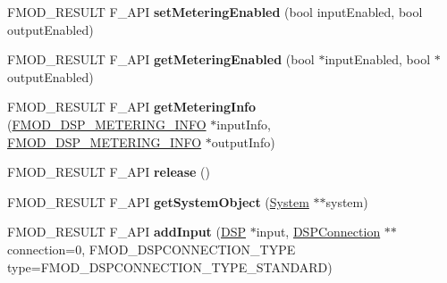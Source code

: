 \begin{DoxyCompactItemize}
\item 
\hypertarget{class_f_m_o_d_1_1_d_s_p_a6632c3020c1a14c13786bab1a3d42688}{F\+M\+O\+D\+\_\+\+R\+E\+S\+U\+L\+T F\+\_\+\+A\+P\+I {\bfseries set\+Metering\+Enabled} (bool input\+Enabled, bool output\+Enabled)}\label{class_f_m_o_d_1_1_d_s_p_a6632c3020c1a14c13786bab1a3d42688}

\item 
\hypertarget{class_f_m_o_d_1_1_d_s_p_af5817c9b777dd6b55f8f5bc53cd3fe17}{F\+M\+O\+D\+\_\+\+R\+E\+S\+U\+L\+T F\+\_\+\+A\+P\+I {\bfseries get\+Metering\+Enabled} (bool $\ast$input\+Enabled, bool $\ast$output\+Enabled)}\label{class_f_m_o_d_1_1_d_s_p_af5817c9b777dd6b55f8f5bc53cd3fe17}

\item 
\hypertarget{class_f_m_o_d_1_1_d_s_p_ad3089cd60092068633a1be0d1771e366}{F\+M\+O\+D\+\_\+\+R\+E\+S\+U\+L\+T F\+\_\+\+A\+P\+I {\bfseries get\+Metering\+Info} (\hyperlink{struct_f_m_o_d___d_s_p___m_e_t_e_r_i_n_g___i_n_f_o}{F\+M\+O\+D\+\_\+\+D\+S\+P\+\_\+\+M\+E\+T\+E\+R\+I\+N\+G\+\_\+\+I\+N\+F\+O} $\ast$input\+Info, \hyperlink{struct_f_m_o_d___d_s_p___m_e_t_e_r_i_n_g___i_n_f_o}{F\+M\+O\+D\+\_\+\+D\+S\+P\+\_\+\+M\+E\+T\+E\+R\+I\+N\+G\+\_\+\+I\+N\+F\+O} $\ast$output\+Info)}\label{class_f_m_o_d_1_1_d_s_p_ad3089cd60092068633a1be0d1771e366}

\item 
\hypertarget{class_f_m_o_d_1_1_d_s_p_a4ffd9dbcf1b0119a2ab94d27744ee033}{F\+M\+O\+D\+\_\+\+R\+E\+S\+U\+L\+T F\+\_\+\+A\+P\+I {\bfseries release} ()}\label{class_f_m_o_d_1_1_d_s_p_a4ffd9dbcf1b0119a2ab94d27744ee033}

\item 
\hypertarget{class_f_m_o_d_1_1_d_s_p_a06bef2d5b365de903e12fff814da31c7}{F\+M\+O\+D\+\_\+\+R\+E\+S\+U\+L\+T F\+\_\+\+A\+P\+I {\bfseries get\+System\+Object} (\hyperlink{class_f_m_o_d_1_1_system}{System} $\ast$$\ast$system)}\label{class_f_m_o_d_1_1_d_s_p_a06bef2d5b365de903e12fff814da31c7}

\item 
\hypertarget{class_f_m_o_d_1_1_d_s_p_abc7912fc7a012c1d47254a9ef8abbe73}{F\+M\+O\+D\+\_\+\+R\+E\+S\+U\+L\+T F\+\_\+\+A\+P\+I {\bfseries add\+Input} (\hyperlink{class_f_m_o_d_1_1_d_s_p}{D\+S\+P} $\ast$input, \hyperlink{class_f_m_o_d_1_1_d_s_p_connection}{D\+S\+P\+Connection} $\ast$$\ast$connection=0, F\+M\+O\+D\+\_\+\+D\+S\+P\+C\+O\+N\+N\+E\+C\+T\+I\+O\+N\+\_\+\+T\+Y\+P\+E type=F\+M\+O\+D\+\_\+\+D\+S\+P\+C\+O\+N\+N\+E\+C\+T\+I\+O\+N\+\_\+\+T\+Y\+P\+E\+\_\+\+S\+T\+A\+N\+D\+A\+R\+D)}\label{class_f_m_o_d_1_1_d_s_p_abc7912fc7a012c1d47254a9ef8abbe73}


\end{DoxyCompactItemize}
